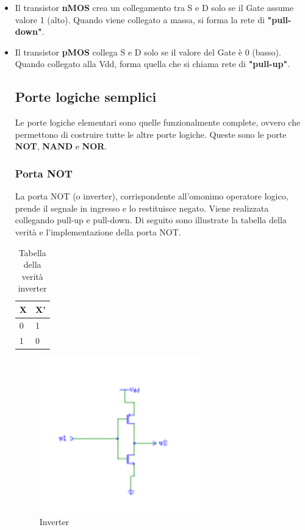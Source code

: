 \documentclass[10pt]{article}
\begin{document}
\begin{itemize}
    \item Il transistor \textbf{nMOS} crea un collegamento tra S e D solo se il Gate assume valore 1 (alto).
    Quando viene collegato a massa, si forma la rete di \textbf{"pull-down"}.
    \item Il transistor \textbf{pMOS} collega S e D solo se il valore del Gate è 0 (basso). Quando collegato alla Vdd,
    forma quella che si chiama rete di \textbf{"pull-up"}.

\subsection{Porte logiche semplici}
Le porte logiche elementari sono quelle funzionalmente complete, ovvero che permettono di costruire tutte le altre porte logiche. 
Queste sono le porte \textbf{NOT}, \textbf{NAND} e \textbf{NOR}.

\subsubsection{Porta NOT}
La porta NOT (o inverter), corrispondente all'omonimo operatore logico, prende il segnale in ingresso e lo restituisce negato. Viene realizzata collegando pull-up e pull-down. Di seguito 
sono illustrate la tabella della verità e l'implementazione della porta NOT.
\begin{table}[ht]
    \begin{minipage}[b]{\textwidth}
    \centering
    \begin{tabular}{ | l | l |}
        \hline
           X    &    X'   \\ \hline	
           0    &    1    \\ 
           1    &    0    \\ \hline
       \end{tabular}
        \caption{Tabella della verità inverter}
        \label{table:student}
    \end{minipage}
    \end{table}
    
    \begin{figure}[H]
    \begin{minipage}[b]{\textwidth}
    
    \includegraphics[width=70mm]{inverter}
    \caption{Inverter}
    \label{ }
    \end{minipage}
    \end{figure}



\end{itemize}
\end{document}
